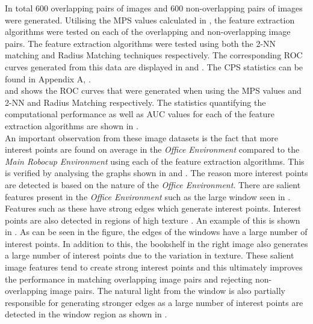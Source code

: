 \documentclass[11pt]{report}
\begin{document}
In total $600$ overlapping pairs of images and $600$ non-overlapping pairs of images were generated. Utilising the MPS values calculated in , the feature extraction algorithms were tested on each of the overlapping and non-overlapping image pairs. The feature extraction algorithms were tested using both the 2-NN matching and Radius Matching techniques respectively. The corresponding ROC curves generated from this data are displayed in  and . The CPS statistics can be found in Appendix A, . \\

 and  shows the ROC curves that were generated when using the MPS values and 2-NN and Radius Matching respectively. The statistics quantifying the computational performance as well as AUC values for each of the feature extraction algorithms are shown in . \\

An important observation from these image datasets is the fact that more interest points are found on average in the \textit{Office Environment} compared to the \textit{Main Robocup Environment} using each of the feature extraction algorithms. This is verified by analysing the graphs shown in  and . The reason more interest points are detected is based on the nature of the \textit{Office Environment}. There are salient features present in the \textit{Office Environment} such as the large window seen in . Features such as these have strong edges which generate interest points. Interest points are also detected in regions of high texture \citep{Szeliski2010}. An example of this is shown in . As can be seen in the figure, the edges of the windows have a large number of interest points. In addition to this, the bookshelf  in the right image also generates a large number of interest points due to the variation in texture. These salient image features tend to create strong interest points and this ultimately improves the performance in matching overlapping image pairs and rejecting non-overlapping image pairs. The natural light from the window is also partially responsible for generating stronger edges as a large number of interest points are detected in the window region as shown in . \\
\end{document}

